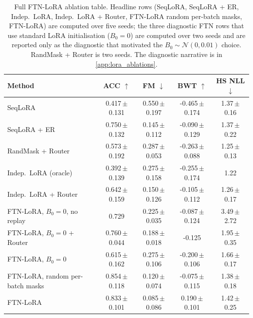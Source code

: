 \begin{table}[t]
\centering
\small
\caption{Full FTN-LoRA ablation table. Headline rows (SeqLoRA, SeqLoRA + ER, Indep.\ LoRA, Indep.\ LoRA + Router, FTN-LoRA random per-batch masks, FTN-LoRA) are computed over five seeds; the three diagnostic FTN rows that use standard LoRA initialisation ($B_0{=}0$) are computed over two seeds and are reported only as the diagnostic that motivated the $B_0{\sim}\mathcal{N}(0,0.01)$ choice. RandMask + Router is two seeds. The diagnostic narrative is in \cref{app:lora_ablations}.}
\label{tab:lora_full}
\begin{tabular}{lcccc}
\toprule
Method & ACC $\uparrow$ & FM $\downarrow$ & BWT $\uparrow$ & HS NLL $\downarrow$ \\
\midrule
SeqLoRA & 0.417\,\scriptsize$\pm$0.131 & 0.550\,\scriptsize$\pm$0.197 & -0.465\,\scriptsize$\pm$0.174 & 1.37\,\scriptsize$\pm$0.16 \\
SeqLoRA + ER & 0.750\,\scriptsize$\pm$0.132 & 0.145\,\scriptsize$\pm$0.112 & -0.090\,\scriptsize$\pm$0.129 & 1.37\,\scriptsize$\pm$0.22 \\
RandMask + Router & 0.573\,\scriptsize$\pm$0.192 & 0.287\,\scriptsize$\pm$0.053 & -0.263\,\scriptsize$\pm$0.088 & 1.25\,\scriptsize$\pm$0.13 \\
Indep.\ LoRA (oracle) & 0.392\,\scriptsize$\pm$0.139 & 0.275\,\scriptsize$\pm$0.158 & -0.255\,\scriptsize$\pm$0.174 & 1.22 \\
Indep.\ LoRA + Router & 0.642\,\scriptsize$\pm$0.159 & 0.150\,\scriptsize$\pm$0.126 & -0.105\,\scriptsize$\pm$0.112 & 1.26\,\scriptsize$\pm$0.17 \\
FTN-LoRA, $B_0=0$, no replay & 0.729 & 0.225\,\scriptsize$\pm$0.035 & -0.087\,\scriptsize$\pm$0.124 & 3.49\,\scriptsize$\pm$2.72 \\
FTN-LoRA, $B_0=0$ + Router & 0.760\,\scriptsize$\pm$0.044 & 0.188\,\scriptsize$\pm$0.018 & -0.125 & 1.95\,\scriptsize$\pm$0.35 \\
FTN-LoRA, $B_0=0$ & 0.615\,\scriptsize$\pm$0.162 & 0.275\,\scriptsize$\pm$0.106 & -0.200\,\scriptsize$\pm$0.106 & 1.66\,\scriptsize$\pm$0.17 \\
FTN-LoRA, random per-batch masks & 0.854\,\scriptsize$\pm$0.118 & 0.120\,\scriptsize$\pm$0.074 & -0.075\,\scriptsize$\pm$0.115 & 1.38\,\scriptsize$\pm$0.18 \\
FTN-LoRA & 0.833\,\scriptsize$\pm$0.101 & 0.085\,\scriptsize$\pm$0.086 & 0.190\,\scriptsize$\pm$0.101 & 1.42\,\scriptsize$\pm$0.25 \\
\bottomrule
\end{tabular}
\end{table}
